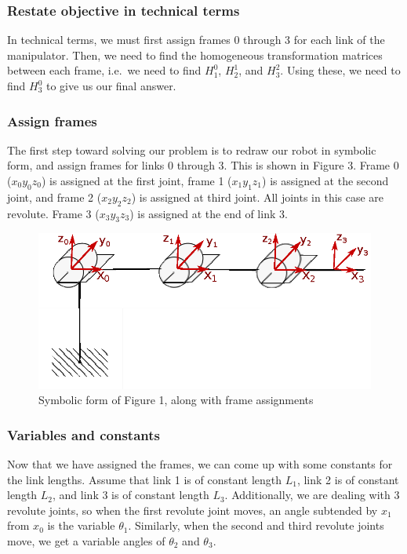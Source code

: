 \documentclass[conference]{IEEEtran}
\begin{document}
\subsubsection{Restate objective in technical terms}
In technical terms, we must first assign frames 0 through 3 for
each link of the manipulator. Then, we need to find the homogeneous
transformation matrices between each frame, i.e.\ we need to find
$H^0_1$, $H^1_2$, and $H^2_3$. Using these, we need to find $H^0_3$
to give us our final answer.

\subsubsection{Assign frames}
The first step toward solving our problem is to redraw our robot in symbolic
form, and assign frames for links 0 through 3. This is shown in
Figure 3. Frame 0 ($x_0 y_0 z_0$) is assigned at the first joint, frame 1
($x_1 y_1 z_1$) is assigned at the
second joint, and frame 2 ($x_2 y_2 z_2$)
 is assigned at third joint. All joints in this case are revolute.
 Frame 3 ($x_3 y_3 z_3$) is assigned at
the end of link 3.\\
\begin{figure}[h]
    \centering
    \includegraphics[scale=0.8]{prob3_2_redraw}
    \caption{Symbolic form of Figure 1, along with frame assignments}
    \setlength{\belowcaptionskip}{-50pt}
\end{figure}
\subsubsection{Variables and constants}
Now that we have assigned the frames, we can come up with some constants for
the link lengths. Assume that link 1 is of constant length $L_1$, link 2 is 
of constant length $L_2$, and link 3 is of constant length $L_3$. Additionally,
we are dealing with 3 revolute joints, so when the first revolute joint moves,
an angle subtended by $x_1$ from $x_0$ is the variable $\theta_1$. Similarly,
when the second and third revolute joints move, we get a variable angles of
$\theta_2$ and $\theta_3$.
\end{document}
